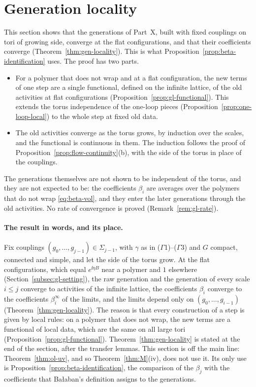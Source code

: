 \section{Generation locality}\label{sec:gen-locality}

This section shows that the generations of Part~X, built with fixed couplings on tori of growing side, converge at the flat configurations, and that their coefficients converge (Theorem~\ref{thm:gen-locality}). This is what Proposition~\ref{prop:beta-identification} uses. The proof has two parts.
\begin{itemize}
\item For a polymer that does not wrap and at a flat configuration, the new terms of one step are a single functional, defined on the infinite lattice, of the old activities at flat configurations (Proposition~\ref{prop:gl-functional}). This extends the torus independence of the one-loop pieces (Proposition~\ref{prop:one-loop-local}) to the whole step at fixed old data.
\item The old activities converge as the torus grows, by induction over the scales, and the functional is continuous in them. The induction follows the proof of Proposition~\ref{prop:flow-continuity}(b), with the side of the torus in place of the couplings.
\end{itemize}
The generations themselves are not shown to be independent of the torus, and they are not expected to be: the coefficients $\beta_i$ are averages over the polymers that do not wrap \eqref{eq:beta-vol}, and they enter the later generations through the old activities. No rate of convergence is proved (Remark~\ref{rem:gl-rate}).

\paragraph{The result in words, and its place.} Fix couplings $(g_0,\dots,g_{j-1})\in\Sigma_{j-1}$, with $\gamma$ as in ($\Gamma$1)--($\Gamma$3) and $G$ compact, connected and simple, and let the side of the torus grow. At the flat configurations, which equal $e^{\ii\eta B}$ near a polymer and $1$ elsewhere (Section~\ref{subsec:gl-setting}), the raw generation and the generation of every scale $i\le j$ converge to activities of the infinite lattice, the coefficients $\beta_i$ converge to the coefficients $\beta^\infty_i$ of the limits, and the limits depend only on $(g_0,\dots,g_{i-1})$ (Theorem~\ref{thm:gen-locality}). The reason is that every construction of a step is given by local rules: on a polymer that does not wrap, the new terms are a functional of local data, which are the same on all large tori (Proposition~\ref{prop:gl-functional}). Theorem~\ref{thm:gen-locality} is stated at the end of the section, after the transfer lemmas. This section is off the main line: Theorem~\ref{thm:ol-uv}, and so Theorem~\ref{thm:M}(iv), does not use it. Its only use is Proposition~\ref{prop:beta-identification}, the comparison of the $\beta_j$ with the coefficients that Ba\l aban's definition assigns to the generations.

